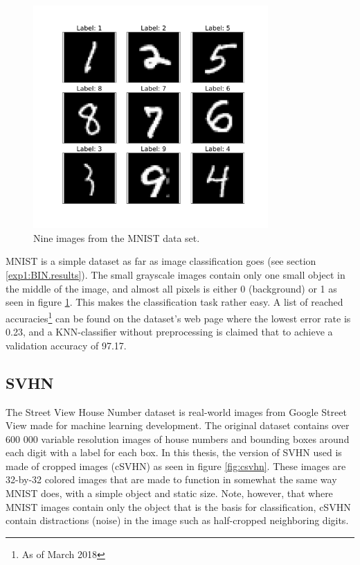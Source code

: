 \begin{figure}[p!]
    \centering
    \includegraphics[width=0.8\textwidth]{Chapters/3.Implementation/figures/MNIST.pdf}
    \caption[MNIST example]{Nine images from the MNIST data set.}
    \label{fig:mnist}
\end{figure}

MNIST is a simple dataset as far as image classification goes (see section \ref{exp1:BIN.results}). The small grayscale images contain only one small object in the middle of the image, and almost all pixels is either 0 (background) or 1 as seen in figure \ref{fig:mnist}. This makes the classification task rather easy. A list of reached accuracies\footnote{As of March 2018} can be found on the dataset's web page\cite{mnistpage} where the lowest error rate is 0.23\cite{goodmnist}, and a KNN-classifier without preprocessing is claimed that to achieve a validation accuracy of 97.17. 


\subsection{SVHN}\label{Implementation:SVHN}
The Street View House Number\cite{SVHN} dataset is real-world images from Google Street View made for machine learning development. The original dataset contains over 600 000 variable resolution images of house numbers and bounding boxes around each digit with a label for each box. In this thesis, the version of SVHN used is made of cropped images (cSVHN) as seen in figure \ref{fig:csvhn}. These images are 32-by-32 colored images that are made to function in somewhat the same way MNIST does, with a simple object and static size. Note, however, that where MNIST images contain only the object that is the basis for classification, cSVHN contain distractions (noise) in the image such as half-cropped neighboring digits. 

